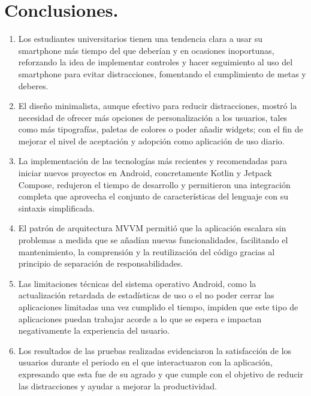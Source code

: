 \section{Conclusiones.}
\label{sec:conclusiones}

\begin{enumerate}
  \item Los estudiantes universitarios tienen una tendencia clara a usar su smartphone más tiempo del que deberían y en ocasiones inoportunas, reforzando la idea de implementar controles y hacer seguimiento al uso del smartphone para evitar distracciones, fomentando el cumplimiento de metas y deberes.
  \item El diseño minimalista, aunque efectivo para reducir distracciones, mostró la necesidad de ofrecer más opciones de personalización a los usuarios, tales como más tipografías, paletas de colores o poder añadir widgets; con el fin de mejorar el nivel de aceptación y adopción como aplicación de uso diario.
  \item La implementación de las tecnologías más recientes y recomendadas para iniciar nuevos proyectos en Android, concretamente Kotlin y Jetpack Compose, redujeron el tiempo de desarrollo y permitieron una integración completa que aprovecha el conjunto de características del lenguaje con su sintaxis simplificada.
  \item El patrón de arquitectura MVVM permitió que la aplicación escalara sin problemas a medida que se añadían nuevas funcionalidades, facilitando el mantenimiento, la comprensión y la reutilización del código gracias al principio de separación de responsabilidades.
  \item Las limitaciones técnicas del sistema operativo Android, como la actualización retardada de estadísticas de uso o el no poder cerrar las aplicaciones limitadas una vez cumplido el tiempo, impiden que este tipo de aplicaciones puedan trabajar acorde a lo que se espera e impactan negativamente la experiencia del usuario.
  \item Los resultados de las pruebas realizadas evidenciaron la satisfacción de los usuarios durante el periodo en el que interactuaron con la aplicación, expresando que esta fue de su agrado y que cumple con el objetivo de reducir las distracciones y ayudar a mejorar la productividad.
\end{enumerate}